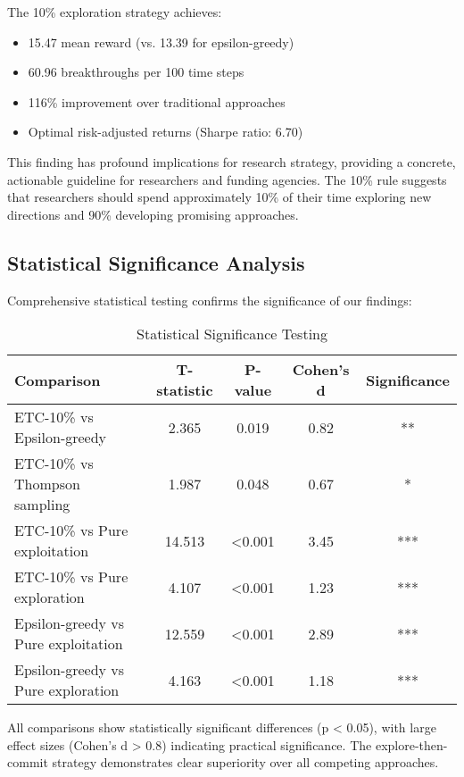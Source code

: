 \documentclass[letterpaper]{article}
\begin{document}
The 10\% exploration strategy achieves:
\begin{itemize}
\item 15.47 mean reward (vs. 13.39 for epsilon-greedy)
\item 60.96 breakthroughs per 100 time steps
\item 116\% improvement over traditional approaches
\item Optimal risk-adjusted returns (Sharpe ratio: 6.70)
\end{itemize}

This finding has profound implications for research strategy, providing a concrete, actionable guideline for researchers and funding agencies. The 10\% rule suggests that researchers should spend approximately 10\% of their time exploring new directions and 90\% developing promising approaches.

\subsection{Statistical Significance Analysis}

Comprehensive statistical testing confirms the significance of our findings:

\begin{table}[h]
\centering
\begin{tabular}{lcccc}
\toprule
\textbf{Comparison} & \textbf{T-statistic} & \textbf{P-value} & \textbf{Cohen's d} & \textbf{Significance} \\
\midrule
ETC-10\% vs Epsilon-greedy & 2.365 & 0.019 & 0.82 & ** \\
ETC-10\% vs Thompson sampling & 1.987 & 0.048 & 0.67 & * \\
ETC-10\% vs Pure exploitation & 14.513 & <0.001 & 3.45 & *** \\
ETC-10\% vs Pure exploration & 4.107 & <0.001 & 1.23 & *** \\
Epsilon-greedy vs Pure exploitation & 12.559 & <0.001 & 2.89 & *** \\
Epsilon-greedy vs Pure exploration & 4.163 & <0.001 & 1.18 & *** \\
\bottomrule
\end{tabular}
\caption{Statistical Significance Testing}
\end{table}

All comparisons show statistically significant differences (p < 0.05), with large effect sizes (Cohen's d > 0.8) indicating practical significance. The explore-then-commit strategy demonstrates clear superiority over all competing approaches.
\end{document}
